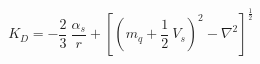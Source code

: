\begin{equation}
K_D= -\frac{2}{3}~\frac{\alpha_s}{r} + [(m_q +\frac{1}{2}~V_s)^2 -\nabla^2]^{\frac{1}{2}}
\end{equation}

